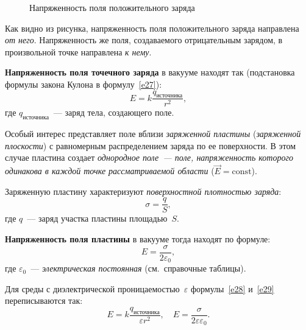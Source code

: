\documentclass[main.tex]{subfiles}
\begin{document}
\begin{NoHyper}
\begin{figure}[H]
\caption{Напряженность поля положительного заряда}
\label{fig:p98}
\end{figure}

Как видно из рисунка, напряженность поля положительного заряда направлена \emph{от него}. 
Напряженность же поля, создаваемого отрицательным зарядом, в произвольной точке направлена \emph{к нему}.

\textbf{Напряженность поля точечного заряда} в вакууме находят так (подстановка формулы закона Кулона в формулу~\eqref{e27}):
\begin{equation}
    \label{e28}
    E=k\frac{q_\text{источника}}{r^2},
\end{equation}
где $q_\text{источника}$~--- заряд тела, создающего поле.

Особый интерес представляет поле вблизи \emph{заряженной пластины} (\emph{заряженной плоскости}) с равномерным распределением заряда по ее поверхности. В этом случае пластина создает \emph{однородное поле~--- поле, напряженность которого одинакова в каждой точке рассматриваемой области} ($\vec E=\mathrm{const}$).

Заряженную пластину характеризуют \emph{поверхностной плотностью заряда}:
\begin{equation}
    \sigma=\frac{q}{S},
\end{equation}
где $q$~--- заряд участка пластины площадью~$S$.

\textbf{Напряженность поля пластины} в вакууме тогда находят по формуле:
\begin{equation}
    \label{e29}
    E=\frac{\sigma}{2\varepsilon_0},
\end{equation}
где $\varepsilon_0$~--- \emph{электрическая постоянная} (см.~справочные таблицы).

Для среды с диэлектрической проницаемостью~$\varepsilon$ формулы~\eqref{e28} и~\eqref{e29} переписываются так:
\begin{equation*}
    E=k\frac{q_\text{источника}}{\varepsilon r^2},\quad E=\frac{\sigma}{2\varepsilon\varepsilon_0}. 
\end{equation*}













\end{NoHyper}
\end{document}
